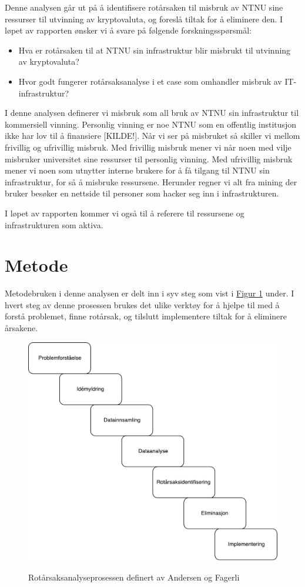 Denne analysen går ut på å identifisere rotårsaken til misbruk av NTNU sine ressurser til utvinning av kryptovaluta, og foreslå tiltak for å eliminere den. I løpet av rapporten ønsker vi å svare på følgende forskningsspørsmål:

\begin{itemize}
    \item Hva er rotårsaken til at NTNU sin infrastruktur blir misbrukt til utvinning av kryptovaluta?
    \item Hvor godt fungerer rotårsaksanalyse i et case som omhandler misbruk av IT-infrastruktur?
\end{itemize}

I denne analysen definerer vi misbruk som all bruk av NTNU sin infrastruktur til kommersiell vinning. Personlig vinning er noe NTNU som en offentlig institusjon ikke har lov til å finansiere [KILDE!]. Når vi ser på misbruket så skiller vi mellom frivillig og ufrivillig misbruk. Med frivillig misbruk mener vi når noen med vilje misbruker universitet sine ressurser til personlig vinning. Med ufrivillig misbruk mener vi noen som utnytter interne brukere for å få tilgang til NTNU sin infrastruktur, for så å misbruke ressursene. Herunder regner vi alt fra mining der bruker besøker en nettside til personer som hacker seg inn i infrastrukturen.



I løpet av rapporten kommer vi også til å referere til ressursene og infrastrukturen som aktiva. 
\section{Metode}
Metodebruken i denne analysen er delt inn i syv steg som vist i \hyperref[fig:prosess]{Figur 1} under. I hvert steg av denne prosessen brukes det ulike verktøy for å hjelpe til med å forstå problemet, finne rotårsak, og tilslutt implementere tiltak for å eliminere årsakene. 
\begin{figure}[H]
    \centering
    \includegraphics[scale=0.6]{case_1/bilder/prosess.pdf}
    \label{fig:prosess}
    \caption[Rotårsaksanalyseprosessen]{Rotårsaksanalyseprosessen definert av Andersen og Fagerli}
\end{figure}